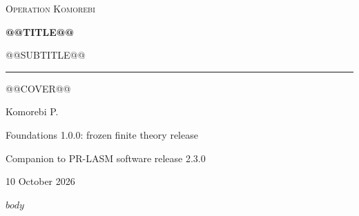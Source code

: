 \documentclass[11pt,letterpaper]{article}
\begin{document}
\hypersetup{pageanchor=false}
\begin{titlepage}
\vspace*{0.5in}
{\small\textsc{Operation Komorebi}\par}
\vspace{0.72in}
{\fontsize{33}{39}\selectfont\bfseries @@TITLE@@\par}
\vspace{0.3in}
{\fontsize{21}{27}\selectfont @@SUBTITLE@@\par}
\vspace{0.45in}
\rule{\textwidth}{0.45pt}\par
\vspace{0.3in}
\begin{minipage}{0.95\textwidth}
\large
@@COVER@@
\end{minipage}
\vfill
{\Large Komorebi P.\par}
\vspace{0.2in}
{\normalsize Foundations 1.0.0: frozen finite theory release\par}
{\normalsize Companion to PR-LASM software release 2.3.0\par}
{\normalsize 10 October 2026\par}
\end{titlepage}
\hypersetup{pageanchor=true}
$body$
\end{document}
